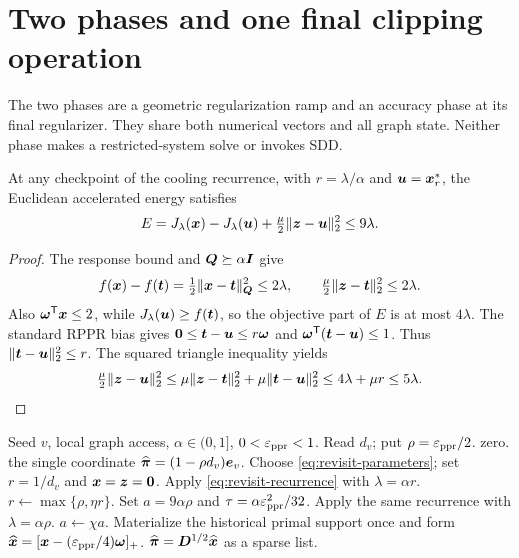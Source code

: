 \section{Two phases and one final clipping operation}
\label{sec:revisit-completion}
The two phases are a geometric regularization ramp and an accuracy phase
at its final regularizer. They share both numerical vectors and all graph
state. Neither phase makes a restricted-system solve or invokes SDD.

\begin{lemma}
\label{lem:revisit-freeze-energy}
At any checkpoint of the cooling recurrence, with
$r=\lambda/\alpha$ and $\bm{u}=\bm{x}_r^*$, the Euclidean accelerated energy
satisfies
\begin{equation}
 E=J_\lambda(\bm{x})-J_\lambda(\bm{u})
                           +\tfrac\mu2\|\bm{z}-\bm{u}\|_2^2\leq9\lambda.
 \label{eq:revisit-freeze-energy}
\end{equation}
\end{lemma}
\begin{proof}
The response bound and $\bm{Q}\succeq\alpha\bm{I}$ give
\[
 f(\bm{x})-f(\bm{t})=\tfrac12\|\bm{x}-\bm{t}\|_{\bm{Q}}^2\leq2\lambda,
 \qquad \tfrac\mu2\|\bm{z}-\bm{t}\|_2^2\leq2\lambda.
\]
Also $\bm{\omega}^{\mathsf{T}}\bm{x}\leq2$, while
$J_\lambda(\bm{u})\geq f(\bm{t})$, so the objective part of $E$ is at most
$4\lambda$. The standard RPPR bias gives
$\bm{0}\leq\bm{t}-\bm{u}\leq r\bm{\omega}$ and
$\bm{\omega}^{\mathsf{T}}(\bm{t}-\bm{u})\leq1$. Thus
$\|\bm{t}-\bm{u}\|_2^2\leq r$. The squared triangle inequality yields
\[
 \tfrac\mu2\|\bm{z}-\bm{u}\|_2^2
 \leq\mu\|\bm{z}-\bm{t}\|_2^2+\mu\|\bm{t}-\bm{u}\|_2^2
 \leq4\lambda+\mu r\leq5\lambda.
\]
\end{proof}

\begin{algorithm}[t]
\caption{Two-phase orthant acceleration for semantic PPR}
\label{alg:revisit-ppr}
\begin{algorithmic}[1]
\REQUIRE Seed $v$, local graph access, $\alpha\in(0,1]$, $0<\varepsilon_{\mathrm{ppr}}<1$.
\STATE Read $d_v$; put $\rho=\varepsilon_{\mathrm{ppr}}/2$.
 \RETURN zero.
\ENDIF
{}
 \RETURN the single coordinate $\widehat{\bm{\pi}}=(1-\rho d_v)\bm{e}_{v}$.
\ENDIF
\STATE Choose \cref{eq:revisit-parameters}; set
       $r=1/d_v$ and $\bm{x}=\bm{z}=\bm{0}$.
 \STATE Apply \cref{eq:revisit-recurrence} with $\lambda=\alpha r$.
 \STATE $r\gets\max\{\rho,\eta r\}$.
\ENDWHILE
\STATE Set $a=9\alpha\rho$ and $\tau=\alpha\varepsilon_{\mathrm{ppr}}^2/32$.
 \STATE Apply the same recurrence with $\lambda=\alpha\rho$.
 \STATE $a\gets\chi a$.
\ENDWHILE
\STATE Materialize the historical primal support once and form
       $\widehat{\bm{x}}=[\bm{x}-(\varepsilon_{\mathrm{ppr}}/4)\bm{\omega}]_+$.
\RETURN $\widehat{\bm{\pi}}=\bm{D}^{1/2}\widehat{\bm{x}}$ as a sparse list.
\end{algorithmic}
\end{algorithm}

